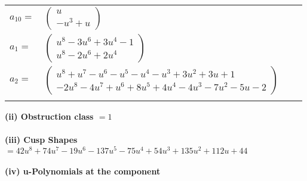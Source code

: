 \documentclass[1p]{elsarticle_modified}
\theoremstyle{definition}
\begin{document}
\begin{tabular}{m{7pt} m{180pt} m{7pt} m{180pt} }
\flushright $a_{10}=$&$\begin{pmatrix}u\\- u^3+u\end{pmatrix}$ \\
\flushright $a_{1}=$&$\begin{pmatrix}u^8-3 u^6+3 u^4-1\\u^8-2 u^6+2 u^4\end{pmatrix}$ \\
\flushright $a_{2}=$&$\begin{pmatrix}u^8+u^7- u^6- u^5- u^4- u^3+3 u^2+3 u+1\\-2 u^8-4 u^7+u^6+8 u^5+4 u^4-4 u^3-7 u^2-5 u-2\end{pmatrix}$\\&\end{tabular}
\flushleft \textbf{(ii) Obstruction class $= 1$}\\~\\
\flushleft \textbf{(iii) Cusp Shapes $= 42 u^8+74 u^7-19 u^6-137 u^5-75 u^4+54 u^3+135 u^2+112 u+44$}\\~\\
\newpage\renewcommand{\arraystretch}{1}
\flushleft \textbf{(iv) u-Polynomials at the component}\newline \\
\end{document}
